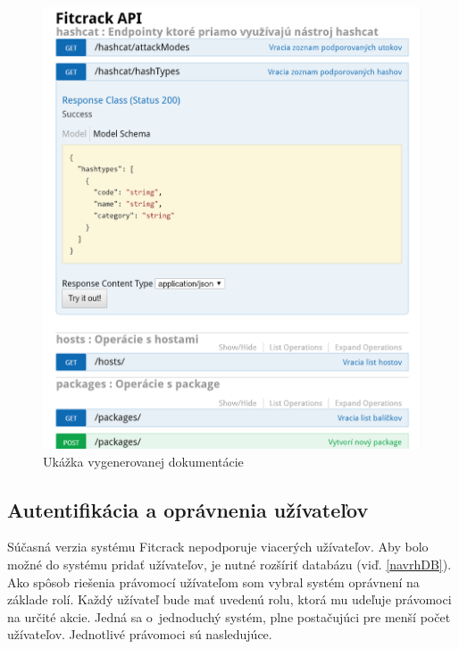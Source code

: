 \documentclass[slovak]{fitthesis}
\begin{document}
\begin{figure}[H]
    \centering
    \includegraphics[scale=0.45]{obrazky/doc.PNG}
    \caption{Ukážka vygenerovanej dokumentácie}
    \label{fig:doc}
\end{figure}

\subsection{Autentifikácia a oprávnenia užívateľov}
Súčasná verzia systému Fitcrack nepodporuje viacerých užívateľov. Aby bolo možné do systému pridať užívateľov, je nutné rozšíriť databázu (viď. \ref{navrhDB}). Ako spôsob riešenia právomocí užívateľom som vybral systém oprávnení na základe rolí. Každý užívateľ bude mať uvedenú rolu, ktorá mu udeľuje právomoci na určité akcie. Jedná sa o~jednoduchý systém, plne postačujúci pre menší počet užívateľov. Jednotlivé právomoci sú nasledujúce.
\end{document}
